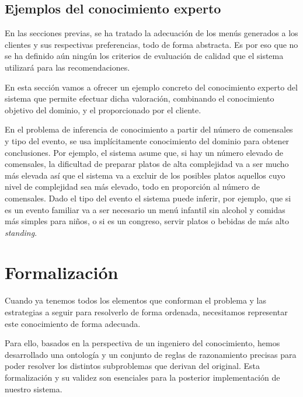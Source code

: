 \documentclass{article}
\begin{document}
\subsection{Ejemplos del conocimiento experto}
En las secciones previas, se ha tratado la adecuación de los menús generados a los clientes y sus respectivas preferencias, todo de forma abstracta. Es por eso que no se ha definido aún ningún los criterios de evaluación de calidad que el sistema utilizará para las recomendaciones.
\par
En esta sección vamos a ofrecer un ejemplo concreto del conocimiento experto del sistema que permite efectuar dicha valoración, combinando el conocimiento objetivo del dominio, y el proporcionado por el cliente.
\par
En el problema de inferencia de conocimiento a partir del número de comensales y tipo del evento, se usa implícitamente  conocimiento del dominio para obtener conclusiones. Por ejemplo, el sistema asume que, si hay un número elevado de comensales, la dificultad de preparar platos de alta complejidad va a ser mucho más elevada así que el sistema va a excluir de los posibles platos aquellos cuyo nivel de complejidad sea más elevado, todo en proporción al número de comensales. Dado el tipo del evento el sistema puede inferir, por ejemplo, que si es un evento familiar va a ser necesario un menú infantil sin alcohol y comidas más simples para niños, o si es un congreso, servir platos o bebidas de más alto \textit{standing}.

\newpage
\section{Formalización}
Cuando ya tenemos todos los elementos que conforman el problema y las estrategias a seguir para resolverlo de forma ordenada, necesitamos representar este conocimiento de forma adecuada.
\par
Para ello, basados en la perspectiva de un ingeniero del conocimiento, hemos desarrollado una ontología y un conjunto de reglas de razonamiento precisas para poder resolver los distintos subproblemas que derivan del original. Esta formalización y su validez son esenciales para la posterior implementación de nuestro sistema.
\end{document}
